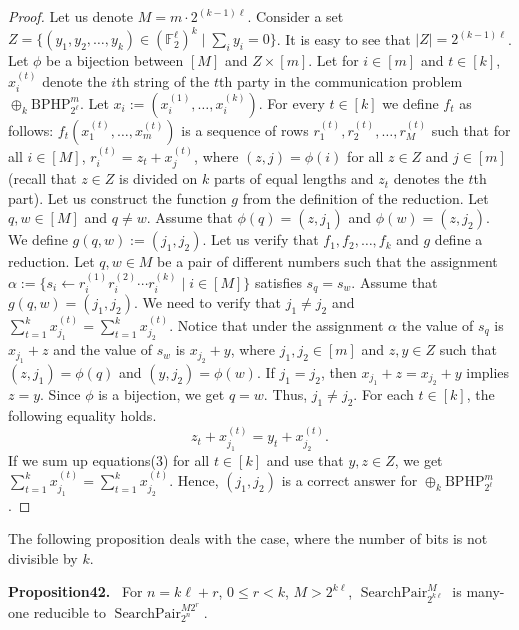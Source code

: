 \documentclass[10pt,a4paper]{article}
\newenvironment{authorclaim}[1]{\par\medskip\noindent\textbf{#1.}\ \ignorespaces}{\par\medskip}
\begin{document}
\begin{proof}
Let us denote $M=m\cdot2^{(k-1)\ell}$. Consider a set
$Z=\{(y_1,y_2,\ldots,y_k)\in(\mathbb F_2^\ell)^k\mid\sum_iy_i=0\}$.
It is easy to see that $|Z|=2^{(k-1)\ell}$. Let $\phi$ be a bijection between $[M]$ and $Z\times[m]$.
Let for $i\in[m]$ and $t\in[k]$, $x_i^{(t)}$ denote the $i$th string of the $t$th party in the communication problem $\oplus_k\mathrm{BPHP}_{2^\ell}^m$. Let $x_i:=(x_i^{(1)},\ldots,x_i^{(k)})$.
For every $t\in[k]$ we define $f_t$ as follows: $f_t(x_1^{(t)},\ldots,x_m^{(t)})$ is a sequence of rows $r_1^{(t)},r_2^{(t)},\ldots,r_M^{(t)}$ such that for all $i\in[M]$, $r_i^{(t)}=z_t+x_j^{(t)}$, where $(z,j)=\phi(i)$ for all $z\in Z$ and $j\in[m]$ (recall that $z\in Z$ is divided on $k$ parts of equal lengths and $z_t$ denotes the $t$th part).
Let us construct the function $g$ from the definition of the reduction.
Let $q,w\in[M]$ and $q\ne w$. Assume that $\phi(q)=(z,j_1)$ and $\phi(w)=(z,j_2)$. We define $g(q,w):=(j_1,j_2)$.
Let us verify that $f_1,f_2,\ldots,f_k$ and $g$ define a reduction. Let $q,w\in M$ be a pair of different numbers such that the assignment $\alpha:=\{s_i\leftarrow r_i^{(1)}r_i^{(2)}\cdots r_i^{(k)}\mid i\in[M]\}$ satisfies $s_q=s_w$.
Assume that $g(q,w)=(j_1,j_2)$. We need to verify that $j_1\ne j_2$ and $\sum_{t=1}^kx_{j_1}^{(t)}=\sum_{t=1}^kx_{j_2}^{(t)}$.
Notice that under the assignment $\alpha$ the value of $s_q$ is $x_{j_1}+z$ and the value of $s_w$ is $x_{j_2}+y$, where $j_1,j_2\in[m]$ and $z,y\in Z$ such that $(z,j_1)=\phi(q)$ and $(y,j_2)=\phi(w)$. If $j_1=j_2$, then $x_{j_1}+z=x_{j_2}+y$ implies $z=y$. Since $\phi$ is a bijection, we get $q=w$. Thus, $j_1\ne j_2$.
For each $t\in[k]$, the following equality holds.
\begin{equation}
z_t+x_{j_1}^{(t)}=y_t+x_{j_2}^{(t)}.\tag{3}
\end{equation}
If we sum up equations(3) for all $t\in[k]$ and use that $y,z\in Z$, we get $\sum_{t=1}^kx_{j_1}^{(t)}=\sum_{t=1}^kx_{j_2}^{(t)}$. Hence, $(j_1,j_2)$ is a correct answer for $\oplus_k\mathrm{BPHP}_{2^\ell}^m$.
\end{proof}
The following proposition deals with the case, where the number of bits is not divisible by $k$.
\begin{authorclaim}{Proposition42}
For $n=k\ell+r$, $0\le r<k$, $M>2^{k\ell}$, $\operatorname{SearchPair}_{2^{k\ell}}^M$ is many-one reducible to $\operatorname{SearchPair}_{2^n}^{M2^r}$.
\end{authorclaim}
\end{document}
